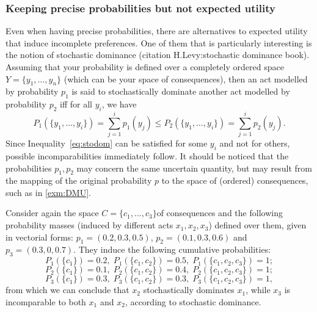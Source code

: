 \documentclass[french, english]{llncs}
\begin{document}
	\subsubsection{Keeping precise probabilities but not expected utility}
	
	Even when having precise probabilities, there are alternatives to expected utility that induce incomplete preferences. One of them that is particularly interesting is the notion of stochastic dominance (citation H.Levy:stochastic dominance book). 
	Assuming that your probability is defined over a completely ordered space $Y=\{y_1,\ldots,y_n\}$ (which can be your space of consequences), then an act modelled by probability $p_1$ is said to stochastically dominate another act modelled by probability $p_2$ iff for all $y_i$, we have
	\begin{equation}\label{eq:stodom}P_1(\{y_1,\ldots,y_i\})=\sum_{j=1}^i p_1(y_j) \leq P_2(\{y_1,\ldots,y_i\})=\sum_{j=1}^i p_2(y_j).\end{equation}
	Since Inequality~\eqref{eq:stodom} can be satisfied for some $y_i$ and not for others, possible incomparabilities immediately follow. It should be noticed that the probabilities $p_1,p_2$ may concern the same uncertain quantity, but may result from the mapping of the original probability $p$ to the space of (ordered) consequences, such as in \cref{exm:DMU}.
	
	\begin{example}
		Consider again the space $C=\{c_1,\ldots,c_3\}$of consequences and the following probability masses (induced by different acts $x_1,x_2,x_3$) defined over them, given in vectorial forms: $p_1=(0.2,0.3,0.5)$, $p_2=(0.1,0.3,0.6)$ and $p_3=(0.3,0,0.7)$. They induce the following cumulative probabilities:
		$$P_1(\{c_1\})=0.2, \; P_1(\{c_1,c_2\})=0.5, \; P_1(\{c_1,c_2,c_3\})=1; $$
		$$P_2(\{c_1\})=0.1, \; P_2(\{c_1,c_2\})=0.4, \; P_2(\{c_1,c_2,c_3\})=1;$$
		$$P_3(\{c_1\})=0.3, \; P_3(\{c_1,c_2\})=0.3, \; P_3(\{c_1,c_2,c_3\})=1, $$
		from which we can conclude that $x_2$ stochastically dominates $x_1$, while $x_3$ is incomparable to both $x_1$ and $x_2$, according to stochastic dominance.
	\end{example}
	
\end{document}
